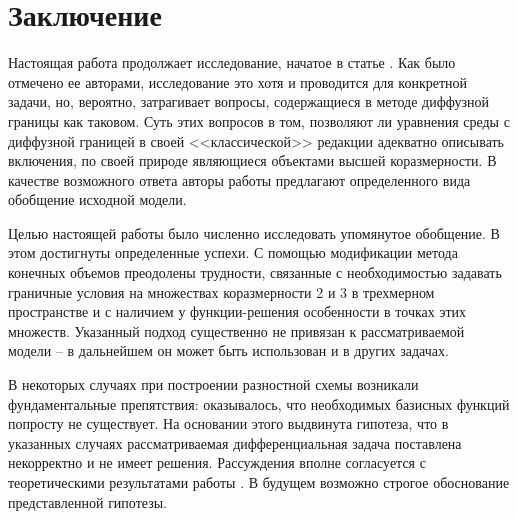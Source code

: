 
\section{Заключение}

Настоящая работа продолжает исследование, начатое в статье \cite{zipunova_higher_codimension}. Как было отмечено ее авторами, исследование это хотя и проводится для конкретной задачи, но, вероятно, затрагивает вопросы, содержащиеся в методе диффузной границы как таковом. Суть этих вопросов в том, позволяют ли уравнения среды с диффузной границей в своей <<классической>> редакции адекватно описывать включения, по своей природе являющиеся объектами высшей коразмерности. В качестве возможного ответа авторы работы \cite{zipunova_higher_codimension} предлагают определенного вида обобщение исходной модели.

Целью настоящей работы было численно исследовать упомянутое обобщение. В этом достигнуты определенные успехи. С помощью модификации метода конечных объемов преодолены трудности, связанные с необходимостью задавать граничные условия на множествах коразмерности 2 и 3 в трехмерном пространстве и с наличием у функции-решения  особенности в точках этих множеств. Указанный подход существенно не привязан к рассматриваемой модели -- в дальнейшем он может быть использован и в других задачах.

В некоторых случаях при построении разностной схемы возникали фундаментальные препятствия: оказывалось, что необходимых базисных функций попросту не существует. На основании этого выдвинута гипотеза, что в указанных случаях рассматриваемая дифференциальная задача поставлена некорректно и не имеет решения. Рассуждения вполне согласуется с теоретическими результатами работы \cite{zipunova_higher_codimension}. В будущем возможно строгое обоснование представленной гипотезы.